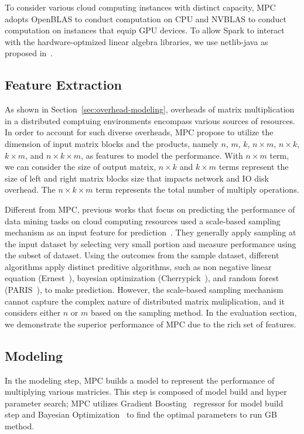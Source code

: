 \documentclass[10pt, conference, compsocconf]{IEEEtran}
\begin{document}
To consider various cloud computing instances with distinct capacity, MPC adopts OpenBLAS to conduct computation on CPU and NVBLAS to conduct computation on instances that equip GPU devices. To allow Spark to interact with the hardware-optmized linear algebra libraries, we use netlib-java as proposed in~\cite{fatman-littleboy}.

\subsection{Feature Extraction}
As shown in Section~\ref{sec:overhead-modeling}, overheads of matrix multiplication in a distributed comptuing environments encompass various sources of resources. In order to account for such diverse overheads, MPC propose to utilize the dimension of input matrix blocks and the products, namely $n$, $m$, $k$, $n \times m$, $n \times k$, $k \times m$, and $n \times k \times m$, as features to model the performance. With $n \times m$ term, we can consider the size of output matrix, $n \times k$ and $k \times m$ terms represent the size of left and right matrix blocks size that impacts network and IO disk overhead. The $n \times k \times m$ term represents the total number of multiply operations.

Different from MPC, previous works that focus on predicting the performance of data mining tasks on cloud computing resources used a scale-based sampling mechanism as an input feature for prediction~\cite{ernest, cherrypick, paris}. They generally apply sampling at the input dataset by selecting very small portion and measure performance using the subset of dataset. Using the outcomes from the sample dataset, different algorithms apply distinct preditive algorithms, such as non negative linear equation (Ernest~\cite{ernest}), bayesian optimization (Cherrypick~\cite{cherrypick}), and random forest (PARIS~\cite{paris}), to make prediction. However, the scale-based sampling mechanism cannot capture the complex nature of distributed matrix muliplication, and it considers either $n$ or $m$ based on the sampling method. In the evaluation section, we demonstrate the superior performance of MPC due to the rich set of features.

\subsection{Modeling}
In the modeling step, MPC builds a model to represent the performance of multiplying various matricies. This step is composed of model build and hyper parameter search; MPC utilizes Gradient Boosting~\cite{gradient-boosting} regressor for model build step and Bayesian Optimization~\cite{bayesian-optimization} to find the optimal parameters to run GB method.
\end{document}
